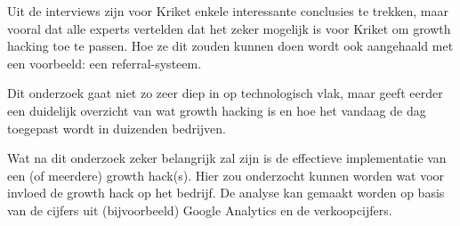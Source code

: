 Uit de interviews zijn voor Kriket enkele interessante conclusies te trekken, maar vooral dat alle experts vertelden dat het zeker mogelijk is voor Kriket om growth hacking toe te passen. Hoe ze dit zouden kunnen doen wordt ook aangehaald met een voorbeeld: een referral-systeem. 

Dit onderzoek gaat niet zo zeer diep in op technologisch vlak, maar geeft eerder een duidelijk overzicht van wat growth hacking is en hoe het vandaag de dag toegepast wordt in duizenden bedrijven.  

Wat na dit onderzoek zeker belangrijk zal zijn is de effectieve implementatie van een (of meerdere) growth hack(s). Hier zou onderzocht kunnen worden wat voor invloed de growth hack op het bedrijf. De analyse kan gemaakt worden op basis van de cijfers uit (bijvoorbeeld) Google Analytics en de verkoopcijfers.